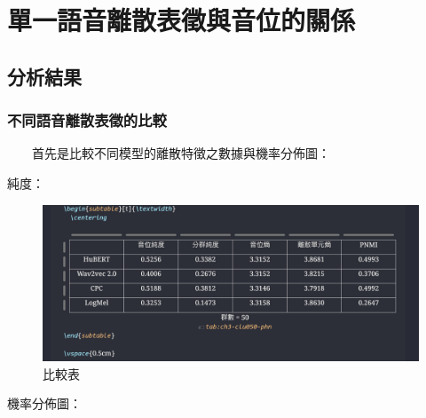 \chapter{單一語音離散表徵與音位的關係} 

\section{分析結果}

\subsection{不同語音離散表徵的比較}

　　首先是比較不同模型的離散特徵之數據與機率分佈圖：

純度：
{

\begin{figure}
    \centering
    \includegraphics[width=1\linewidth]{figures/000.png}
    \caption{比較表}
    \label{fig:enter-label}
\end{figure}

}
機率分佈圖：
